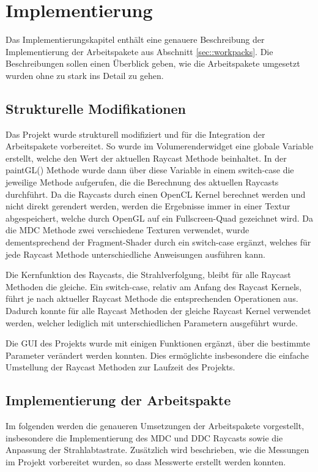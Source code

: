 \chapter{Implementierung}\label{chap::impl}
Das Implementierungskapitel enthält eine genauere Beschreibung der Implementierung der Arbeitspakete aus Abschnitt \ref{sec::workpacks}.
Die Beschreibungen sollen einen Überblick geben, wie die Arbeitspakete umgesetzt wurden ohne zu stark ins Detail zu gehen.

\section{Strukturelle Modifikationen}\label{sec::sm}
Das Projekt wurde strukturell modifiziert und für die Integration der Arbeitspakete vorbereitet.
So wurde im Volumerenderwidget eine globale Variable erstellt, welche den Wert der aktuellen Raycast Methode beinhaltet.
In der paintGL() Methode wurde dann über diese Variable in einem switch-case die jeweilige Methode aufgerufen, die die Berechnung des aktuellen Raycasts durchführt.
Da die Raycasts durch einen OpenCL Kernel berechnet werden und nicht direkt gerendert werden, werden die Ergebnisse immer in einer Textur abgespeichert, welche durch OpenGL auf ein Fullscreen-Quad gezeichnet wird.
Da die MDC Methode zwei verschiedene Texturen verwendet, wurde dementsprechend der Fragment-Shader durch ein switch-case ergänzt, welches für jede Raycast Methode unterschiedliche Anweisungen ausführen kann.

Die Kernfunktion des Raycasts, die Strahlverfolgung, bleibt für alle Raycast Methoden die gleiche.
Ein switch-case, relativ am Anfang des Raycast Kernels, führt je nach aktueller Raycast Methode die entsprechenden Operationen aus.
Dadurch konnte für alle Raycast Methoden der gleiche Raycast Kernel verwendet werden, welcher lediglich mit unterschiedlichen Parametern ausgeführt wurde.

Die GUI des Projekts wurde mit einigen Funktionen ergänzt, über die bestimmte Parameter verändert werden konnten.
Dies ermöglichte insbesondere die einfache Umstellung der Raycast Methoden zur Laufzeit des Projekts.

\section{Implementierung der Arbeitspakte}\label{sec::ida}
Im folgenden werden die genaueren Umsetzungen der Arbeitspakete vorgestellt, insbesondere die Implementierung des MDC und DDC Raycasts sowie die Anpassung der Strahlabtastrate.
Zusätzlich wird beschrieben, wie die Messungen im Projekt vorbereitet wurden, so dass Messwerte erstellt werden konnten.

